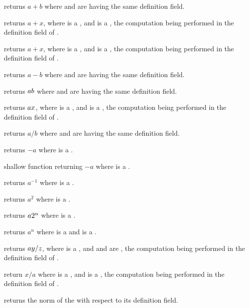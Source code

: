  returns $a+b$ where  and  are
 having the same definition field.

 returns $a+x$, where  is a
, and  is a , the computation being
performed in the definition field of .

 returns $a+x$, where  is a
, and  is a , the computation being
performed in the definition field of .

 returns $a-b$ where  and  are
 having the same definition field.

 returns $a\*b$ where  and  are
 having the same definition field.

 returns $a\*x$, where  is a
, and  is a , the computation being
performed in the definition field of .

 returns $a/b$ where  and  are
 having the same definition field.

 returns $-a$ where  is a .

 shallow function returning $-a$ where  is a
.

 returns $a^{-1}$ where  is a .

 returns $a^2$ where  is a .

 returns $a\*2^n$ where  is a .

 returns $a^n$ where  is a 
and is a .

 returns $a\*y/z$, where 
is a , and  and  are , the computation being
performed in the definition field of .

 return $x/a$ where  is a
, and  is a , the computation being
performed in the definition field of .

 returns the norm of the   with
respect to its definition field.

